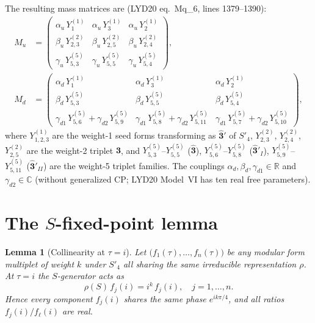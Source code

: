 \documentclass[a4paper,11pt]{article}
\newtheorem{lemma}{Lemma}
\newcommand{\Spf}{S'_4}
\newcommand{\tauCM}{\tau = i}
\newcommand{\Md}{M_d}
\newcommand{\Mu}{M_u}
\begin{document}
The resulting mass matrices are (LYD20 eq.~Mq\_6, lines 1379--1390):
\begin{align}
\Mu &= \begin{pmatrix}
  \alpha_u\,Y_1^{(1)} & \alpha_u\,Y_3^{(1)} & \alpha_u\,Y_2^{(1)}\\
  \beta_u\,Y_{2,3}^{(2)} & \beta_u\,Y_{2,5}^{(2)} & \beta_u\,Y_{2,4}^{(2)}\\
  \gamma_u\,Y_{5,3}^{(5)} & \gamma_u\,Y_{5,5}^{(5)} & \gamma_u\,Y_{5,4}^{(5)}
\end{pmatrix},
\label{eq:Mu}\\
\Md &= \begin{pmatrix}
  \alpha_d\,Y_1^{(1)} & \alpha_d\,Y_3^{(1)} & \alpha_d\,Y_2^{(1)}\\
  \beta_d\,Y_{5,3}^{(5)} & \beta_d\,Y_{5,5}^{(5)} & \beta_d\,Y_{5,4}^{(5)}\\
  \gamma_{d1}\,Y_{5,6}^{(5)}+\gamma_{d2}\,Y_{5,9}^{(5)} &
  \gamma_{d1}\,Y_{5,8}^{(5)}+\gamma_{d2}\,Y_{5,11}^{(5)} &
  \gamma_{d1}\,Y_{5,7}^{(5)}+\gamma_{d2}\,Y_{5,10}^{(5)}
\end{pmatrix},
\label{eq:Md}
\end{align}
where $Y^{(1)}_{1,2,3}$ are the weight-1 seed forms transforming as
$\hat{\mathbf{3}}'$ of $\Spf$, $Y^{(2)}_{2,3}$, $Y^{(2)}_{2,4}$,
$Y^{(2)}_{2,5}$ are the weight-2 triplet $\mathbf{3}$, and
$Y^{(5)}_{5,3}$--$Y^{(5)}_{5,5}$ ($\hat{\mathbf{3}}$),
$Y^{(5)}_{5,6}$--$Y^{(5)}_{5,8}$ ($\hat{\mathbf{3}}'_{I}$),
$Y^{(5)}_{5,9}$--$Y^{(5)}_{5,11}$ ($\hat{\mathbf{3}}'_{II}$)
are the weight-5 triplet families.
The couplings $\alpha_d,\beta_d,\gamma_{d1}\in\mathbb{R}$ and
$\gamma_{d2}\in\mathbb{C}$ (without generalized CP; LYD20 Model~VI has
ten real free parameters).

\section{The $S$-fixed-point lemma}
\label{sec:lemma}

\begin{lemma}[Collinearity at $\tauCM$]
\label{lem:collinear}
Let $\bigl(f_1(\tau),\ldots,f_n(\tau)\bigr)$ be any modular form
multiplet of weight $k$ under $\Spf$ all sharing the same irreducible
representation $\rho$.  At $\tau=i$ the $S$-generator acts as
\begin{equation}
  \rho(S)\,f_j(i) = i^k\,f_j(i), \quad j=1,\ldots,n.
\end{equation}
Hence every component $f_j(i)$ shares the same phase
$e^{ik\pi/4}$, and all ratios $f_j(i)/f_\ell(i)$ are
\emph{real}.
\end{lemma}
\end{document}
